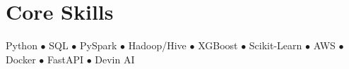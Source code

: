 \section{Core Skills}
\small{Python $\bullet$ SQL $\bullet$ PySpark $\bullet$ Hadoop/Hive $\bullet$ XGBoost $\bullet$ Scikit-Learn $\bullet$ AWS $\bullet$ Docker $\bullet$ FastAPI $\bullet$ Devin AI}
\vspace{-4pt}
